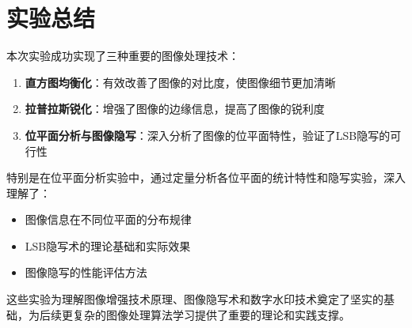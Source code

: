 \documentclass[a4paper]{article}
\begin{document}
\section{实验总结}

本次实验成功实现了三种重要的图像处理技术：

\begin{enumerate}
    \item \textbf{直方图均衡化}：有效改善了图像的对比度，使图像细节更加清晰
    \item \textbf{拉普拉斯锐化}：增强了图像的边缘信息，提高了图像的锐利度
    \item \textbf{位平面分析与图像隐写}：深入分析了图像的位平面特性，验证了LSB隐写的可行性
\end{enumerate}

特别是在位平面分析实验中，通过定量分析各位平面的统计特性和隐写实验，深入理解了：
\begin{itemize}
    \item 图像信息在不同位平面的分布规律
    \item LSB隐写术的理论基础和实际效果
    \item 图像隐写的性能评估方法
\end{itemize}

这些实验为理解图像增强技术原理、图像隐写术和数字水印技术奠定了坚实的基础，为后续更复杂的图像处理算法学习提供了重要的理论和实践支撑。
\end{document}
